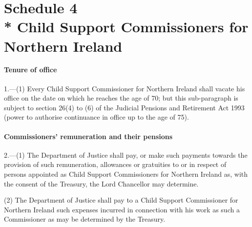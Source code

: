 \documentclass[12pt,a4paper]{article}
\begin{document}
\part[Schedule 4 --- Child Support Commissioners for Northern Ireland]{Schedule 4\\* Child Support Commissioners for Northern Ireland}

\renewcommand\parthead{--- Schedule 4}


\subsection*{Tenure of office}

1.—(1) Every Child Support Commissioner for Northern Ireland shall vacate his office on the date on which he reaches the age of 70; but this sub-paragraph is subject to section 26(4) to (6) of the Judicial Pensions and Retirement Act 1993 (power to authorise continuance in office up to the age of 75).


\subsection*{Commissioners' remuneration and their pensions}

2.—(1) The Department of Justice shall pay, or make such payments towards the provision of such remuneration, allowances or gratuities to or in respect of persons appointed as Child Support Commissioners for Northern Ireland as, with the consent of the Treasury, the Lord Chancellor may determine.

(2) The Department of Justice shall pay to a Child Support Commissioner for Northern Ireland such expenses incurred in connection with his work as such a Commissioner as may be determined by the Treasury.
\end{document}
